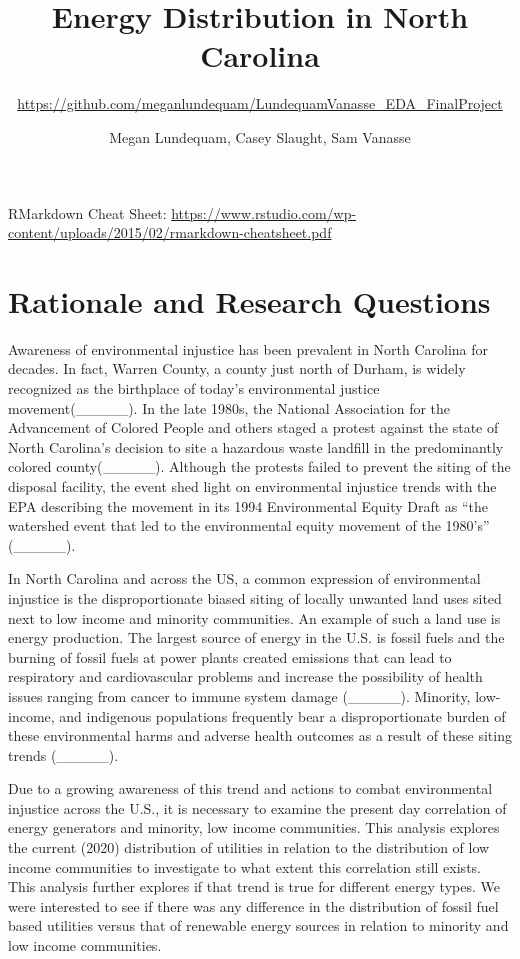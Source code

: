 \documentclass[
  12pt,
]{article}
\title{Energy Distribution in North Carolina}
\subtitle{\url{https://github.com/meganlundequam/LundequamVanasse_EDA_FinalProject}}
\author{Megan Lundequam, Casey Slaught, Sam Vanasse}
\date{}
\begin{document}
\maketitle

RMarkdown Cheat Sheet:
\url{https://www.rstudio.com/wp-content/uploads/2015/02/rmarkdown-cheatsheet.pdf}

\newpage
\tableofcontents 
\newpage
\listoftables 
\newpage
\listoffigures 
\newpage

\hypertarget{rationale-and-research-questions}{%
\section{Rationale and Research
Questions}\label{rationale-and-research-questions}}

Awareness of environmental injustice has been prevalent in North
Carolina for decades. In fact, Warren County, a county just north of
Durham, is widely recognized as the birthplace of today's environmental
justice movement(\_\_\_\_\_). In the late 1980s, the National
Association for the Advancement of Colored People and others staged a
protest against the state of North Carolina's decision to site a
hazardous waste landfill in the predominantly colored
county(\_\_\_\_\_). Although the protests failed to prevent the siting
of the disposal facility, the event shed light on environmental
injustice trends with the EPA describing the movement in its 1994
Environmental Equity Draft as ``the watershed event that led to the
environmental equity movement of the 1980's'' (\_\_\_\_\_).

In North Carolina and across the US, a common expression of
environmental injustice is the disproportionate biased siting of locally
unwanted land uses sited next to low income and minority communities. An
example of such a land use is energy production. The largest source of
energy in the U.S. is fossil fuels and the burning of fossil fuels at
power plants created emissions that can lead to respiratory and
cardiovascular problems and increase the possibility of health issues
ranging from cancer to immune system damage (\_\_\_\_\_). Minority,
low-income, and indigenous populations frequently bear a
disproportionate burden of these environmental harms and adverse health
outcomes as a result of these siting trends (\_\_\_\_\_).

Due to a growing awareness of this trend and actions to combat
environmental injustice across the U.S., it is necessary to examine the
present day correlation of energy generators and minority, low income
communities. This analysis explores the current (2020) distribution of
utilities in relation to the distribution of low income communities to
investigate to what extent this correlation still exists. This analysis
further explores if that trend is true for different energy types. We
were interested to see if there was any difference in the distribution
of fossil fuel based utilities versus that of renewable energy sources
in relation to minority and low income communities.
\end{document}
